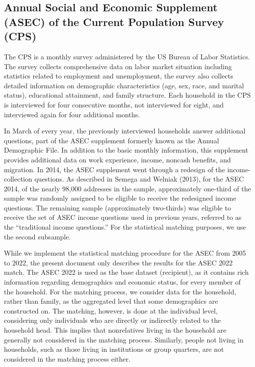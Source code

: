 \documentclass[
  11pt,
]{article}
\begin{document}
\subsection{Annual Social and Economic Supplement (ASEC) of the Current
Population Survey
(CPS)}\label{annual-social-and-economic-supplement-asec-of-the-current-population-survey-cps}

The CPS is a monthly survey administered by the US Bureau of Labor
Statistics. The survey collects comprehensive data on labor market
situation including statistics related to employment and unemployment,
the survey also collects detailed information on demographic
characteristics (age, sex, race, and marital status), educational
attainment, and family structure. Each household in the CPS is
interviewed for four consecutive months, not interviewed for eight, and
interviewed again for four additional months.

In March of every year, the previously interviewed households answer
additional questions, part of the ASEC supplement formerly known as the
Annual Demographic File. In addition to the basic monthly information,
this supplement provides additional data on work experience, income,
noncash benefits, and migration. In 2014, the ASEC supplement went
through a redesign of the income-collection questions. As described in
Semega and Welniak (2013), for the ASEC 2014, of the nearly 98,000
addresses in the sample, approximately one-third of the sample was
randomly assigned to be eligible to receive the redesigned income
questions. The remaining sample (approximately two-thirds) was eligible
to receive the set of ASEC income questions used in previous years,
referred to as the ``traditional income questions.'' For the statistical
matching purposes, we use the second subsample.

While we implement the statistical matching procedure for the ASEC from
2005 to 2022, the present document only describes the results for the
ASEC 2022 match. The ASEC 2022 is used as the base dataset (recipient),
as it contains rich information regarding demographics and economic
status, for every member of the household. For the matching process, we
consider data for the household, rather than family, as the aggregated
level that some demographics are constructed on. The matching, however,
is done at the individual level, considering only individuals who are
directly or indirectly related to the household head. This implies that
nonrelatives living in the household are generally not considered in the
matching process. Similarly, people not living in households, such as
those living in institutions or group quarters, are not considered in
the matching process either.
\end{document}
